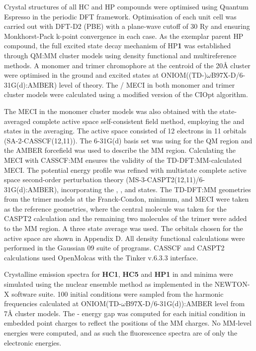 Crystal structures of all \ac{HC} and \ac{HP} compounds were optimised using Quantum Espresso in the periodic DFT framework.\cite{QE-2009} Optimisation of each unit cell was carried out with DFT-D2 (PBE) with a plane-wave cutoff of 30 Ry and ensuring Monkhorst-Pack k-point convergence in each case. As the exemplar parent \ac{HP} compound, the full excited state decay mechanism of \ac{HP}\textbf{1} was established through QM:MM cluster models using density functional and multireference methods. A monomer and trimer chromophore at the centroid of the 20{\AA} cluster were optimised in the ground and excited states at ONIOM((TD-)$\omega$B97X-D/6-31G(d):AMBER) level of theory. The \sone/\szero{} MECI in both monomer and trimer cluster models were calculated using a modified version of the CIOpt algorithm.\cite{Levine2008} 

The MECI in the monomer cluster models was also obtained with the state-averaged complete active space self-consistent field method, employing the \szero{} and \sone{} states in the averaging. The active space consisted of 12 electrons in 11 orbitals (SA-2-CASSCF(12,11)). The 6-31G(d) basis set was using for the QM region and the AMBER forcefield was used to describe the MM region. Calculating the MECI with CASSCF:MM ensures the validity of the TD-DFT:MM-calculated MECI. The potential energy profile was refined with multistate complete active space second-order perturbation theory (MS-3-CASPT2(12,11)/6-31G(d):AMBER), incorporating the \szero{}, \sone{}, and \stwo{} states. The TD-DFT:MM geometries from the trimer models at the Franck-Condon, \sone{} minimum, and MECI were taken as the reference geometries, where the central molecule was taken for the CASPT2 calculation and the remaining two molecules of the trimer were added to the MM region.  A three state average was used. The orbitals chosen for the active space are shown in Appendix D. All density functional calculations were performed in the Gaussian 09 suite of programs.\cite{g09} CASSCF and CASPT2 calculations used OpenMolcas with the Tinker v.6.3.3 interface.\cite{Aquilante2016}

Crystalline emission spectra for \textbf{HC1}, \textbf{HC5} and \textbf{HP1} in \Estar{} and \Kstar{} minima were simulated using the nuclear ensemble method as implemented in the NEWTON-X software suite.\cite{Barbatti2014} 100 initial conditions were sampled from the harmonic frequencies calculated at ONIOM(TD-$\omega$B97X-D/6-31G(d)):AMBER level from 7\AA{} cluster models. The \sone{}-\szero{} energy gap was computed for each initial condition in embedded point charges to reflect the positions of the MM charges. No MM-level energies were computed, and as such the fluorescence spectra are of only the electronic energies.


